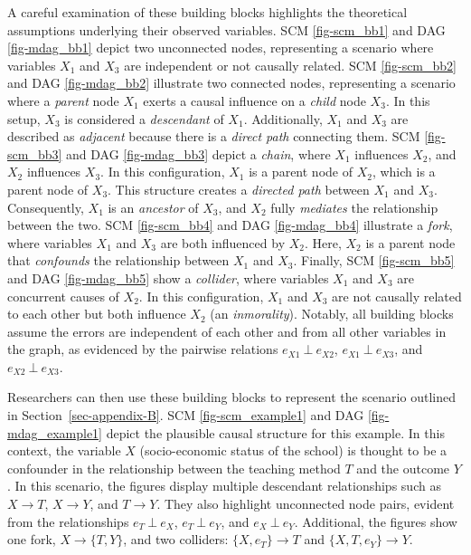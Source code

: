 \documentclass[
  authoryear,
  review,
  1p]{elsarticle}
\begin{document}
A careful examination of these building blocks highlights the
theoretical assumptions underlying their observed variables. SCM
\ref{fig-scm_bb1} and DAG \ref{fig-mdag_bb1} depict two unconnected
nodes, representing a scenario where variables \(X_{1}\) and \(X_{3}\)
are independent or not causally related. SCM \ref{fig-scm_bb2} and DAG
\ref{fig-mdag_bb2} illustrate two connected nodes, representing a
scenario where a \emph{parent} node \(X_{1}\) exerts a causal influence
on a \emph{child} node \(X_{3}\). In this setup, \(X_{3}\) is considered
a \emph{descendant} of \(X_{1}\). Additionally, \(X_{1}\) and \(X_{3}\)
are described as \emph{adjacent} because there is a \emph{direct path}
connecting them. SCM \ref{fig-scm_bb3} and DAG \ref{fig-mdag_bb3} depict
a \emph{chain}, where \(X_{1}\) influences \(X_{2}\), and \(X_{2}\)
influences \(X_{3}\). In this configuration, \(X_{1}\) is a parent node
of \(X_{2}\), which is a parent node of \(X_{3}\). This structure
creates a \emph{directed path} between \(X_{1}\) and \(X_{3}\).
Consequently, \(X_{1}\) is an \emph{ancestor} of \(X_{3}\), and
\(X_{2}\) fully \emph{mediates} the relationship between the two. SCM
\ref{fig-scm_bb4} and DAG \ref{fig-mdag_bb4} illustrate a \emph{fork},
where variables \(X_{1}\) and \(X_{3}\) are both influenced by
\(X_{2}\). Here, \(X_{2}\) is a parent node that \emph{confounds} the
relationship between \(X_{1}\) and \(X_{3}\). Finally, SCM
\ref{fig-scm_bb5} and DAG \ref{fig-mdag_bb5} show a \emph{collider},
where variables \(X_{1}\) and \(X_{3}\) are concurrent causes of
\(X_{2}\). In this configuration, \(X_{1}\) and \(X_{3}\) are not
causally related to each other but both influence \(X_{2}\) (an
\emph{inmorality}). Notably, all building blocks assume the errors are
independent of each other and from all other variables in the graph, as
evidenced by the pairwise relations \(e_{X1} \:\bot\:e_{X2}\),
\(e_{X1} \:\bot\:e_{X3}\), and \(e_{X2} \:\bot\:e_{X3}\).

Researchers can then use these building blocks to represent the scenario
outlined in Section~\ref{sec-appendix-B}. SCM \ref{fig-scm_example1} and
DAG \ref{fig-mdag_example1} depict the plausible causal structure for
this example. In this context, the variable \(X\) (socio-economic status
of the school) is thought to be a confounder in the relationship between
the teaching method \(T\) and the outcome \(Y\). In this scenario, the
figures display multiple descendant relationships such as
\(X \rightarrow T\), \(X \rightarrow Y\), and \(T \rightarrow Y\). They
also highlight unconnected node pairs, evident from the relationships
\(e_{T} \:\bot\:e_{X}\), \(e_{T} \:\bot\:e_{Y}\), and
\(e_{X} \:\bot\:e_{Y}\). Additional, the figures show one fork,
\(X \rightarrow \{T, Y\}\), and two colliders:
\(\{X, e_{T}\} \rightarrow T\) and \(\{X, T, e_{Y}\} \rightarrow Y\).
\end{document}
